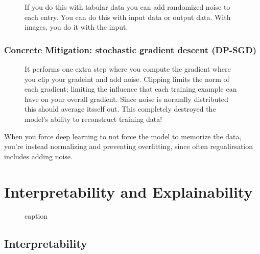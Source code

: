 \documentclass[11pt]{article}
\begin{document}
\begin{figure}[H]
    \centering
\end{figure}

\begin{figure}[H]
    \centering
    \caption{If you do this with tabular data you can add randomized noise to each entry. You can do this with input data or output data. With images, you do it with the input.}
\end{figure}

\subsubsection{Concrete Mitigation: stochastic gradient descent (DP-SGD)}

\begin{figure}[H]
    \centering
    \caption{It performs one extra step where you compute the gradient where you clip your gradeint and add noise. Clipping limits the norm of each gradient; limiting the influence that each training example can have on your overall gradient. Since noise is noramlly distributed this should average itsself out. This completely destroyed the model's ability to reconstruct training data!}
\end{figure}

When you force deep learning to not force the model to memorize the data, you're instead normalizing and preventing overfitting, since often regualirsation includes adding noise.

\section{Interpretability and Explainability}

\begin{figure}[H]
    \centering
    \caption{caption}
\end{figure}

\subsection{Interpretability}
\end{document}
